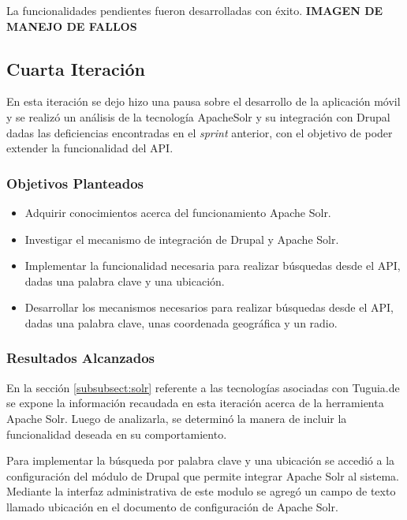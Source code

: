 La funcionalidades pendientes fueron desarrolladas con éxito. 
  \textbf{IMAGEN DE MANEJO DE FALLOS}

\subsection{Cuarta Iteración}

En esta iteración se dejo hizo una pausa sobre el desarrollo de la aplicación móvil y se realizó un análisis de la tecnología ApacheSolr y su integración con Drupal dadas las deficiencias encontradas en el \textit{sprint} anterior, con el objetivo de poder extender la funcionalidad del API. 

\subsubsection{Objetivos Planteados} 
\begin{itemize}

\item Adquirir conocimientos acerca del funcionamiento Apache Solr.
\item Investigar el mecanismo de integración de Drupal y Apache Solr.
\item Implementar la funcionalidad necesaria para realizar búsquedas desde el API, dadas una palabra clave y una ubicación.
\item Desarrollar los mecanismos necesarios para realizar búsquedas desde el API, dadas una palabra clave, unas coordenada geográfica y un radio.

\end{itemize}

\subsubsection{Resultados Alcanzados}

En la sección \ref{subsubsect:solr} referente a las tecnologías asociadas con Tuguia.de se expone la información recaudada en esta iteración acerca de la herramienta Apache Solr. Luego de analizarla, se determinó la manera de incluir la funcionalidad deseada en su comportamiento.

Para implementar la búsqueda por palabra clave y una ubicación se accedió a la configuración del módulo de Drupal que permite integrar Apache Solr al sistema. Mediante la interfaz administrativa de este modulo se agregó un campo de texto llamado ubicación en el documento de configuración de Apache Solr. 

